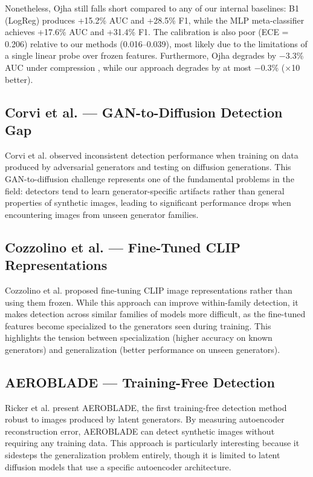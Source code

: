 \documentclass[12pt,a4paper]{book}
\theoremstyle{definition}
\theoremstyle{remark}
\begin{document}
Nonetheless, Ojha still falls short compared to any of our internal baselines: B1 (LogReg) produces +15.2\% AUC and +28.5\% F1, while the MLP meta-classifier achieves +17.6\% AUC and +31.4\% F1. The calibration is also poor (ECE = 0.206) relative to our methods (0.016--0.039), most likely due to the limitations of a single linear probe over frozen features. Furthermore, Ojha degrades by $-$3.3\% AUC under compression \cite{ojha2023towards}, while our approach degrades by at most $-$0.3\% ($\times$10 better).


\subsection{Corvi et al. --- GAN-to-Diffusion Detection Gap}\label{sec:corvi}

Corvi et al. \cite{corvi2023detection} observed inconsistent detection performance when training on data produced by adversarial generators and testing on diffusion generations. This GAN-to-diffusion challenge represents one of the fundamental problems in the field: detectors tend to learn generator-specific artifacts rather than general properties of synthetic images, leading to significant performance drops when encountering images from unseen generator families.


\subsection{Cozzolino et al. --- Fine-Tuned CLIP Representations}\label{sec:cozzolino}

Cozzolino et al. \cite{cozzolino2024raising} proposed fine-tuning CLIP image representations rather than using them frozen. While this approach can improve within-family detection, it makes detection across similar families of models more difficult, as the fine-tuned features become specialized to the generators seen during training. This highlights the tension between specialization (higher accuracy on known generators) and generalization (better performance on unseen generators).


\subsection{AEROBLADE --- Training-Free Detection}\label{sec:aeroblade}

Ricker et al. \cite{ricker2024aeroblade} present AEROBLADE, the first training-free detection method robust to images produced by latent generators. By measuring autoencoder reconstruction error, AEROBLADE can detect synthetic images without requiring any training data. This approach is particularly interesting because it sidesteps the generalization problem entirely, though it is limited to latent diffusion models that use a specific autoencoder architecture.
\end{document}
